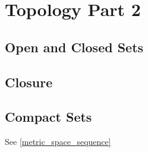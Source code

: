 \section{Topology Part 2}
\subsection{Open and Closed Sets}


\subsection{Closure}



\subsection{Compact Sets}
See \ref{metric_space_sequence}



